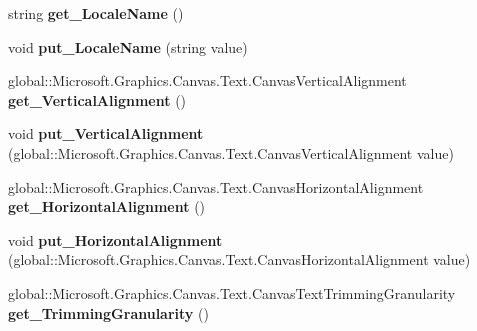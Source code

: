 \begin{DoxyCompactItemize}
string {\bfseries get\+\_\+\+Locale\+Name} ()
\item 
\mbox{\label{class_microsoft_1_1_graphics_1_1_canvas_1_1_text_1_1_canvas_text_format_ad8facd01f087e75c6d8dde3e81ac836f}} 
void {\bfseries put\+\_\+\+Locale\+Name} (string value)
\item 
\mbox{\label{class_microsoft_1_1_graphics_1_1_canvas_1_1_text_1_1_canvas_text_format_a4400b8ea39646d7a48f76a32e6197d12}} 
global\+::\+Microsoft.\+Graphics.\+Canvas.\+Text.\+Canvas\+Vertical\+Alignment {\bfseries get\+\_\+\+Vertical\+Alignment} ()
\item 
\mbox{\label{class_microsoft_1_1_graphics_1_1_canvas_1_1_text_1_1_canvas_text_format_ad8c32a1802c2930e9a41b312f03881b1}} 
void {\bfseries put\+\_\+\+Vertical\+Alignment} (global\+::\+Microsoft.\+Graphics.\+Canvas.\+Text.\+Canvas\+Vertical\+Alignment value)
\item 
\mbox{\label{class_microsoft_1_1_graphics_1_1_canvas_1_1_text_1_1_canvas_text_format_aada5eeeefb336038b13a36fa1c2eafda}} 
global\+::\+Microsoft.\+Graphics.\+Canvas.\+Text.\+Canvas\+Horizontal\+Alignment {\bfseries get\+\_\+\+Horizontal\+Alignment} ()
\item 
\mbox{\label{class_microsoft_1_1_graphics_1_1_canvas_1_1_text_1_1_canvas_text_format_a41dba6b94d37a3688961e2aaf678a2e6}} 
void {\bfseries put\+\_\+\+Horizontal\+Alignment} (global\+::\+Microsoft.\+Graphics.\+Canvas.\+Text.\+Canvas\+Horizontal\+Alignment value)
\item 
\mbox{\label{class_microsoft_1_1_graphics_1_1_canvas_1_1_text_1_1_canvas_text_format_ae84dccbd2abc45d77d283e369c1d8033}} 
global\+::\+Microsoft.\+Graphics.\+Canvas.\+Text.\+Canvas\+Text\+Trimming\+Granularity {\bfseries get\+\_\+\+Trimming\+Granularity} ()
\item 
\mbox{\label{class_microsoft_1_1_graphics_1_1_canvas_1_1_text_1_1_canvas_text_format_acf017333af07452d3399503df70a2ad3}} 

\end{DoxyCompactItemize}
